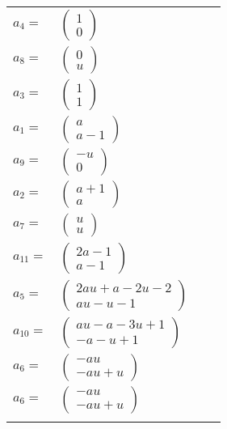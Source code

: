 \documentclass[1p]{elsarticle_modified}
\theoremstyle{definition}
\begin{document}
\begin{tabular}{m{7pt} m{180pt} m{7pt} m{180pt} }
\flushright $a_{4}=$&$\begin{pmatrix}1\\0\end{pmatrix}$ \\
\flushright $a_{8}=$&$\begin{pmatrix}0\\u\end{pmatrix}$ \\
\flushright $a_{3}=$&$\begin{pmatrix}1\\1\end{pmatrix}$ \\
\flushright $a_{1}=$&$\begin{pmatrix}a\\a-1\end{pmatrix}$ \\
\flushright $a_{9}=$&$\begin{pmatrix}- u\\0\end{pmatrix}$ \\
\flushright $a_{2}=$&$\begin{pmatrix}a+1\\a\end{pmatrix}$ \\
\flushright $a_{7}=$&$\begin{pmatrix}u\\u\end{pmatrix}$ \\
\flushright $a_{11}=$&$\begin{pmatrix}2 a-1\\a-1\end{pmatrix}$ \\
\flushright $a_{5}=$&$\begin{pmatrix}2 a u+a-2 u-2\\a u- u-1\end{pmatrix}$ \\
\flushright $a_{10}=$&$\begin{pmatrix}a u- a-3 u+1\\- a- u+1\end{pmatrix}$ \\
\flushright $a_{6}=$&$\begin{pmatrix}- a u\\- a u+u\end{pmatrix}$\\ \flushright $a_{6}=$&$\begin{pmatrix}- a u\\- a u+u\end{pmatrix}$\\&\end{tabular}
\end{document}

